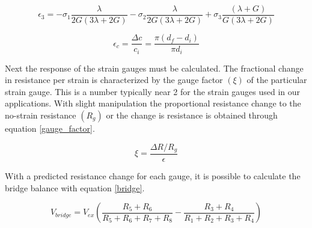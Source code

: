 \begin{equation}
	\epsilon_3 = -\sigma_1\frac{\lambda}{2G(3\lambda+2G)} - \sigma_2\frac{\lambda}{2G(3\lambda+2G)} +
\sigma_3\frac{(\lambda+G)}{G(3 \lambda+2G)}
	\label{hooke3}
\end{equation}

\begin{equation}
	\epsilon_c = \frac{\Delta c}{c_i} = \frac{\pi(d_f-d_i)}{\pi d_i}
	\label{circ}
\end{equation}

Next the response of the strain gauges must be calculated. The fractional change in resistance per strain is characterized by the gauge factor $(\xi)$ of the particular strain gauge. This is a number typically near 2 for the strain gauges used in our applications. With slight manipulation the proportional resistance change to the no-strain resistance $(R_g)$ or the change is resistance is obtained through equation \ref{gauge_factor}. 


\begin{equation}
	\xi = \frac{\Delta R/R_g}{\epsilon}
	\label{gauge_factor}
\end{equation}

With a predicted resistance change for each gauge, it is possible to calculate the bridge balance with equation \ref{bridge}. 

\begin{equation}
	V_{bridge} = V_{ex} \left(\frac{R_5 + R_6}{R_5 + R_6 + R_7 + R_8} - \frac{R_3 + R_4}{R_1 + R_2 + R_3 + R_4}\right)
	\label{bridge}
\end{equation}
